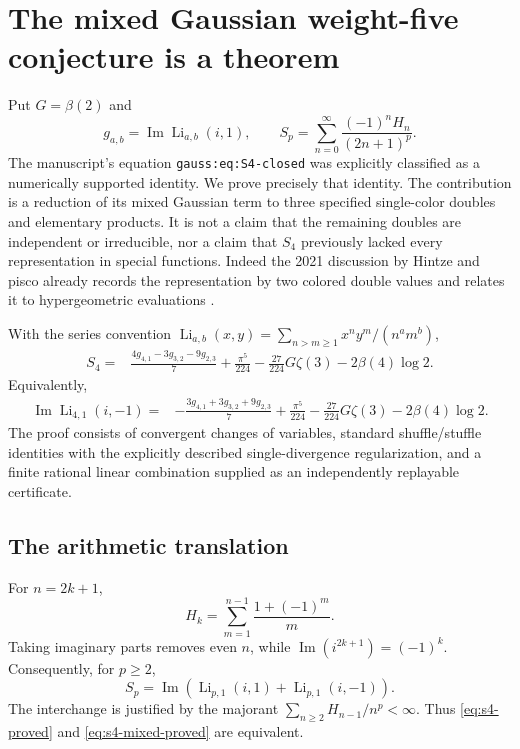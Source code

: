 \section{The mixed Gaussian weight-five conjecture is a theorem}
\label{sec:s4-proof}

Put $G=\beta(2)$ and
\[
 g_{a,b}=\operatorname{Im}\operatorname{Li}_{a,b}(i,1),
 \qquad
 S_p=\sum_{n=0}^{\infty}\frac{(-1)^nH_n}{(2n+1)^p}.
\]
The manuscript's equation \texttt{gauss:eq:S4-closed} was explicitly
classified as a numerically supported identity. We prove precisely that
identity. The contribution is a reduction of its mixed Gaussian term to
three specified single-color doubles and elementary products. It is not a
claim that the remaining doubles are independent or irreducible, nor a
claim that $S_4$ previously lacked every representation in special functions.
Indeed the 2021 discussion by Hintze and pisco already records the
representation by two colored double values and relates it to
hypergeometric evaluations \cite{hintze2021s4,mhzhao2020}.

\begin{theorem}\label{thm:s4}
With the series convention
$\operatorname{Li}_{a,b}(x,y)=\sum_{n>m\ge1}x^ny^m/(n^am^b)$,
\begin{align}
 S_4={}&\frac{4g_{4,1}-3g_{3,2}-9g_{2,3}}7
       +\frac{\pi^5}{224}
       -\frac{27}{224}G\zeta(3)-2\beta(4)\log2.
 \label{eq:s4-proved}
\end{align}
Equivalently,
\begin{align}
 \operatorname{Im}\operatorname{Li}_{4,1}(i,-1)
 ={}&-\frac{3g_{4,1}+3g_{3,2}+9g_{2,3}}7
       +\frac{\pi^5}{224}
       -\frac{27}{224}G\zeta(3)-2\beta(4)\log2.
 \label{eq:s4-mixed-proved}
\end{align}
The proof consists of convergent changes of variables, standard
shuffle/stuffle identities with the explicitly described single-divergence
regularization, and a finite rational linear combination supplied as an
independently replayable certificate.
\end{theorem}

\subsection{The arithmetic translation}
For $n=2k+1$,
\[
 H_k=\sum_{m=1}^{n-1}\frac{1+(-1)^m}{m}.
\]
Taking imaginary parts removes even $n$, while
$\operatorname{Im}(i^{2k+1})=(-1)^k$. Consequently, for $p\ge2$,
\begin{equation}\label{eq:s-harmonic-translation}
 S_p=\operatorname{Im}\left(
 \operatorname{Li}_{p,1}(i,1)+\operatorname{Li}_{p,1}(i,-1)\right).
\end{equation}
The interchange is justified by the majorant
$\sum_{n\ge2}H_{n-1}/n^p<\infty$.
Thus \eqref{eq:s4-proved} and \eqref{eq:s4-mixed-proved} are equivalent.

